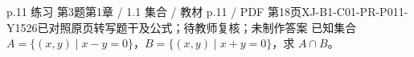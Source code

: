 \par\noindent\begin{minipage}{\linewidth}
\begin{bankitem}{p.11 练习 第3题}{第1章 / 1.1 集合 / 教材 p.11 / PDF 第18页}{XJ-B1-C01-PR-P011-Y1526}{已对照原页转写题干及公式；待教师复核；未制作答案}
已知集合 $A=\{(x,y)\mid x-y=0\}$，$B=\{(x,y)\mid x+y=0\}$，求 $A\cap B$。
\end{bankitem}
\end{minipage}\par\medskip
